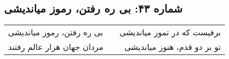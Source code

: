 \begin{center}
\section*{شماره ۴۳: بی ره رفتن، رموز میاندیشی}
\label{sec:043}
\begin{longtable}{l p{0.5cm} r}
بی ره رفتن، رموز میاندیشی
&&
برفیست که در تموز میاندیشی
\\
مردان جهان هزار عالم رفتند
&&
تو بر دو قدم، هنوز میاندیشی
\\
\end{longtable}
\end{center}

